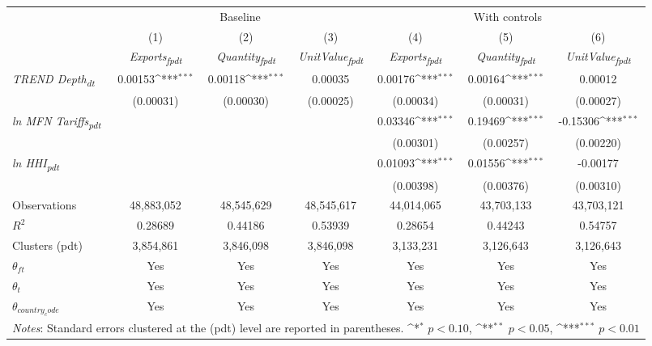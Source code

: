 {
\def\sym#1{\ifmmode^{#1}\else\(^{#1}\)\fi}
\begin{tabular}{l*{6}{c}}
\toprule
&\multicolumn{3}{c}{Baseline}&\multicolumn{3}{c}{With controls}\\\cmidrule(lr){2-4}\cmidrule(lr){5-7}
&(1)&(2)&(3)&(4)&(5)&(6)\\
&\textit{Exports\textsubscript{fpdt}}&\textit{Quantity\textsubscript{fpdt}}&\textit{UnitValue\textsubscript{fpdt}}&\textit{Exports\textsubscript{fpdt}}&\textit{Quantity\textsubscript{fpdt}}&\textit{UnitValue\textsubscript{fpdt}}\\
\midrule
\textit{TREND Depth\textsubscript{dt}} & 0.00153\sym{***} & 0.00118\sym{***} & 0.00035 & 0.00176\sym{***} & 0.00164\sym{***} & 0.00012\\
 & (0.00031) & (0.00030) & (0.00025) & (0.00034) & (0.00031) & (0.00027)\\
\addlinespace
\textit{ln MFN Tariffs\textsubscript{pdt}} &  &  &  & 0.03346\sym{***} & 0.19469\sym{***} & -0.15306\sym{***}\\
 &  &  &  & (0.00301) & (0.00257) & (0.00220)\\
\addlinespace
\textit{ln HHI\textsubscript{pdt}} &  &  &  & 0.01093\sym{***} & 0.01556\sym{***} & -0.00177\\
 &  &  &  & (0.00398) & (0.00376) & (0.00310)\\
\midrule
Observations & 48,883,052 & 48,545,629 & 48,545,617 & 44,014,065 & 43,703,133 & 43,703,121\\
$R^{2}$ & 0.28689 & 0.44186 & 0.53939 & 0.28654 & 0.44243 & 0.54757\\
Clusters (pdt) & 3,854,861 & 3,846,098 & 3,846,098 & 3,133,231 & 3,126,643 & 3,126,643\\
$\theta_{ft}$ & Yes & Yes & Yes & Yes & Yes & Yes\\
$\theta_{t}$ & Yes & Yes & Yes & Yes & Yes & Yes\\
$\theta_{country_code}$ & Yes & Yes & Yes & Yes & Yes & Yes\\
\bottomrule
\multicolumn{7}{l}{\footnotesize \textit{Notes}: Standard errors clustered at the (pdt) level are reported in parentheses. \sym{*} \(p<0.10\), \sym{**} \(p<0.05\), \sym{***} \(p<0.01\)}\\
\end{tabular}
}
